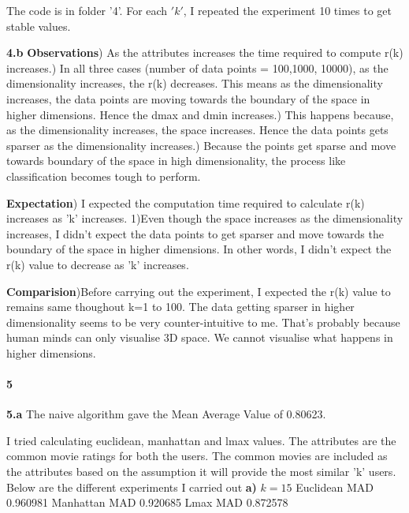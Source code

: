 \documentclass{article}
\begin{document}
The code is in folder  '4'. For each $'k'$, I repeated the experiment 10 times to get stable values.\newline

\textbf{4.b}
\textbf{Observations}) As the attributes increases the time required to compute r(k) increases.) In all three cases (number of data points = 100,1000, 10000), as the dimensionality increases, the r(k) decreases. This means as the dimensionality increases, the data points are moving towards the boundary of the space in higher dimensions. Hence the dmax and dmin increases.) This happens because, as the dimensionality increases, the space increases. Hence the data points gets sparser as the dimensionality increases.) Because the points get sparse and move towards boundary of the space in high dimensionality, the process like classification becomes tough to perform.\newline

\textbf{Expectation}) I expected the computation time required to calculate r(k) increases as 'k' increases.
1)Even though the space increases as the dimensionality increases, I didn't expect the data points to get sparser and move towards the boundary of the space in higher dimensions. In other words, I didn't expect the r(k) value to decrease as 'k' increases.\newline

\textbf{Comparision})Before carrying out the experiment, I expected the r(k) value to remains same thoughout k=1 to 100. The data getting sparser in higher dimensionality seems to be very counter-intuitive to me. That's probably because human minds can only visualise 3D space. We cannot visualise what happens in higher dimensions.

\paragraph{5}
\textbf{5.a}\newline
The naive algorithm gave the Mean Average Value of 0.80623.\newline

I tried calculating euclidean, manhattan and lmax values. The attributes are the common movie ratings for both the users. The common movies are included as the attributes based on the assumption it will provide the most similar 'k' users. \newline
Below are the different experiments I carried out \newline
\textbf{a)} $k=15$\newline
Euclidean MAD 0.960981\newline
Manhattan MAD 0.920685\newline
Lmax MAD 0.872578\newline
\end{document}
